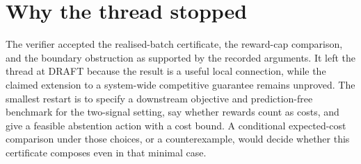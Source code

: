 \documentclass{article}
\begin{document}
\section{Why the thread stopped}

The verifier accepted the realised-batch certificate, the reward-cap comparison, and the boundary
obstruction as supported by the recorded arguments. It left the thread at DRAFT because the result
is a useful local connection, while the claimed extension to a system-wide competitive guarantee
remains unproved. The smallest restart is to specify a downstream objective and prediction-free
benchmark for the two-signal setting, say whether rewards count as costs, and give a feasible
abstention action with a cost bound. A conditional expected-cost comparison under those choices, or
a counterexample, would decide whether this certificate composes even in that minimal case.



\end{document}
